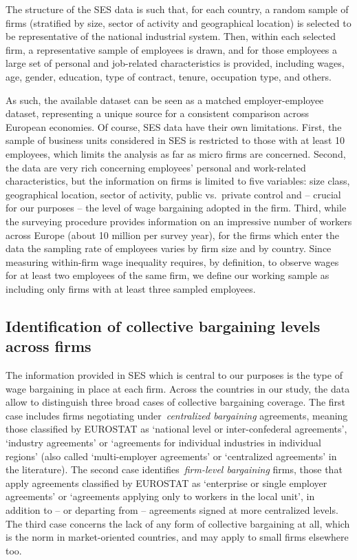 \documentclass[Review,times,sageh,11pt]{sagej}
\begin{document}
The structure of the SES data is such that, for each country, a random sample of firms (stratified by size, sector of activity and geographical location) is selected to be representative of the national industrial system. Then, within each selected firm, a representative sample of employees is drawn, and for those employees a large set of personal and job-related characteristics is provided, including wages, age, gender, education, type of contract, tenure, occupation type, and others. 

As such, the available dataset can be seen as a matched employer-employee dataset, representing a unique source for a consistent comparison across European economies.  Of course, SES data have their own limitations. First, the sample of business units considered in SES is restricted to those with at least 10 employees, which limits the analysis as far as micro firms are concerned. Second, the data are very rich concerning employees' personal and work-related characteristics, but the information on firms is limited to five variables: size class, geographical location, sector of activity, public vs.\ private control and -- crucial for our purposes -- the level of wage bargaining adopted in the firm. Third, while the surveying procedure provides information on an impressive number of workers across Europe (about 10 million per survey year), for the firms which enter the data the sampling rate of employees varies by firm size and by country. Since measuring within-firm wage inequality requires, by definition, to observe wages for at least two employees of the same firm, we define our working sample as including only firms with at least three sampled employees.

\subsection*{Identification of collective bargaining levels across firms}
\label{sec:decentralisation}
The information provided in SES which is central to our purposes is the type of wage bargaining in place at each firm. Across the countries in our study, the data allow to distinguish three broad cases of collective bargaining coverage. The first case includes firms negotiating under~\emph{centralized bargaining} agreements, meaning those classified by EUROSTAT as ‘national level or inter-confederal agreements’, ‘industry agreements’ or ‘agreements for individual industries in individual regions’ (also called ‘multi-employer agreements’ or ‘centralized agreements’ in the literature). The second case identifies~\emph{firm-level bargaining} firms, those that apply agreements classified by EUROSTAT as ‘enterprise or single employer agreements’ or ‘agreements applying only to workers in the local unit’, in addition to -- or departing from -- agreements signed at more centralized levels. The third case concerns the lack of any form of collective bargaining at all, which is the norm in market-oriented countries, and may apply to small firms elsewhere too.
\end{document}
